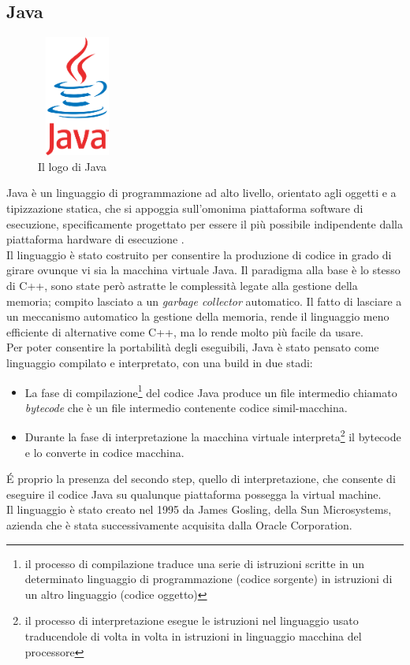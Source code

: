 \subsection{Java}
\begin{figure}[h]
    \centering
    \includegraphics[width=100px, height=150px]{./images/Java.png}
    \caption{Il logo di Java}
    \label{fig:Java}
\end{figure}
Java è un linguaggio di programmazione ad alto livello, orientato agli oggetti e a tipizzazione statica, che si appoggia sull'omonima piattaforma software di esecuzione, specificamente progettato per essere il più possibile indipendente dalla piattaforma hardware di esecuzione \cite{JavaDef}. 
\\
Il linguaggio è stato costruito per consentire la produzione di codice in grado di girare ovunque vi sia la macchina virtuale Java. Il paradigma alla base è lo stesso di C++, sono state però astratte le complessità legate alla gestione della memoria; compito lasciato a un \emph{garbage collector} automatico. Il fatto di lasciare a un meccanismo automatico la gestione della memoria, rende il linguaggio meno efficiente di alternative come C++, ma lo rende molto più facile da usare.
\\
Per poter consentire la portabilità degli eseguibili, Java è stato pensato come linguaggio compilato e interpretato, con una build in due stadi:
\begin{itemize}
    \item La fase di compilazione\footnote{
     il processo di compilazione traduce una serie di istruzioni scritte in un determinato linguaggio di programmazione (codice sorgente) in istruzioni di un altro linguaggio (codice oggetto)\cite{CompilazioneWiki}
    } del codice Java produce un file intermedio chiamato \emph{bytecode} che è un file intermedio contenente codice simil-macchina.
    \item Durante la fase di interpretazione la macchina virtuale interpreta\footnote{
    il processo di interpretazione esegue le istruzioni nel linguaggio usato traducendole di volta in volta in istruzioni in linguaggio macchina del processore\cite{InterpretazioneWiki}
    } il bytecode e lo converte in codice macchina.
\end{itemize}
\'E proprio la presenza del secondo step, quello di interpretazione, che consente di eseguire il codice Java su qualunque piattaforma possegga la virtual machine.
\\
Il linguaggio è stato creato nel 1995 da James Gosling, della Sun Microsystems, azienda che è stata successivamente acquisita dalla Oracle Corporation.

